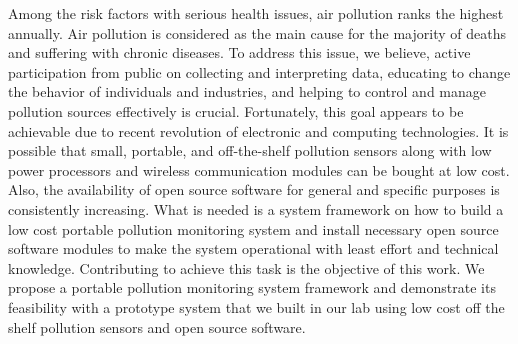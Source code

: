 \documentclass[a4paper,12pt,titlepage,oneside]{report}
\begin{document}
Among the risk factors with serious health issues, air
pollution ranks the highest annually. Air pollution is considered
as the main cause for the majority of deaths and suffering
with chronic diseases. To address this issue, we believe, active
participation from public on collecting and interpreting data,
educating to change the behavior of individuals and industries,
and helping to control and manage pollution sources effectively
is crucial. Fortunately, this goal appears to be achievable due to
recent revolution of electronic and computing technologies. It is
possible that small, portable, and off-the-shelf pollution sensors
along with low power processors and wireless communication
modules can be bought at low cost. Also, the availability of open
source software for general and specific purposes is consistently
increasing. What is needed is a system framework on how
to build a low cost portable pollution monitoring system and
install necessary open source software modules to make the
system operational with least effort and technical knowledge.
Contributing to achieve this task is the objective of this work.
We propose a portable pollution monitoring system framework
and demonstrate its feasibility with a prototype system that we
built in our lab using low cost off the shelf pollution sensors and
open source software.


\newpage
{} %
\tableofcontents

\newpage
{}   %
\listoftables

\newpage
{}   %
\listoffigures
\onehalfspacing
\newpage
{}  %
\end{document}
